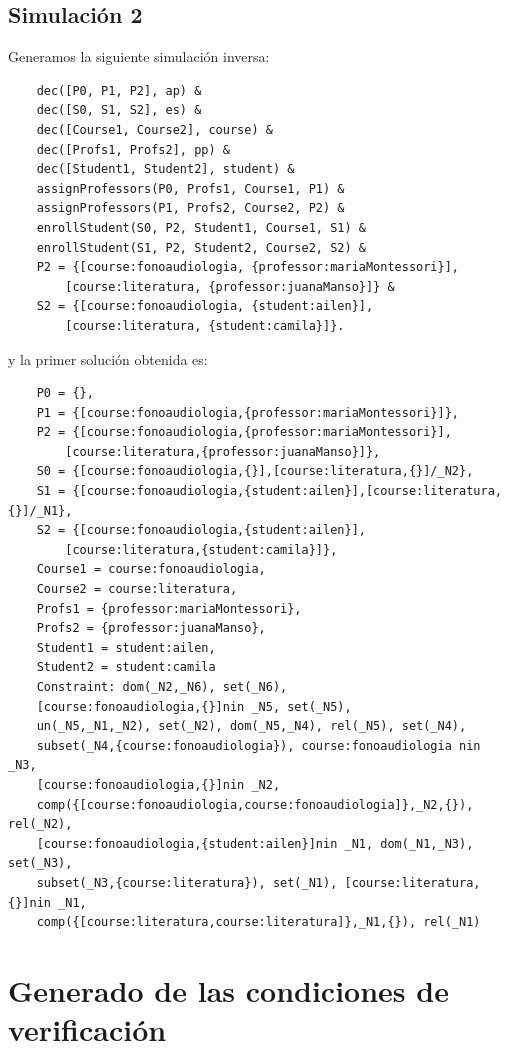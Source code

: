 \documentclass{article}
\begin{document}
\subsection*{Simulación 2}

Generamos la siguiente simulación inversa:

\begin{verbatim}
    dec([P0, P1, P2], ap) & 
    dec([S0, S1, S2], es) & 
    dec([Course1, Course2], course) & 
    dec([Profs1, Profs2], pp) & 
    dec([Student1, Student2], student) & 
    assignProfessors(P0, Profs1, Course1, P1) & 
    assignProfessors(P1, Profs2, Course2, P2) & 
    enrollStudent(S0, P2, Student1, Course1, S1) & 
    enrollStudent(S1, P2, Student2, Course2, S2) & 
    P2 = {[course:fonoaudiologia, {professor:mariaMontessori}], 
        [course:literatura, {professor:juanaManso}]} & 
    S2 = {[course:fonoaudiologia, {student:ailen}], 
        [course:literatura, {student:camila}]}.
\end{verbatim}

y la primer solución obtenida es:

\begin{verbatim}
    P0 = {},  
    P1 = {[course:fonoaudiologia,{professor:mariaMontessori}]},  
    P2 = {[course:fonoaudiologia,{professor:mariaMontessori}],
        [course:literatura,{professor:juanaManso}]},  
    S0 = {[course:fonoaudiologia,{}],[course:literatura,{}]/_N2},  
    S1 = {[course:fonoaudiologia,{student:ailen}],[course:literatura,{}]/_N1},  
    S2 = {[course:fonoaudiologia,{student:ailen}],
        [course:literatura,{student:camila}]},  
    Course1 = course:fonoaudiologia,  
    Course2 = course:literatura,  
    Profs1 = {professor:mariaMontessori},  
    Profs2 = {professor:juanaManso},  
    Student1 = student:ailen,  
    Student2 = student:camila
    Constraint: dom(_N2,_N6), set(_N6), 
    [course:fonoaudiologia,{}]nin _N5, set(_N5), 
    un(_N5,_N1,_N2), set(_N2), dom(_N5,_N4), rel(_N5), set(_N4), 
    subset(_N4,{course:fonoaudiologia}), course:fonoaudiologia nin _N3, 
    [course:fonoaudiologia,{}]nin _N2,
    comp({[course:fonoaudiologia,course:fonoaudiologia]},_N2,{}), rel(_N2), 
    [course:fonoaudiologia,{student:ailen}]nin _N1, dom(_N1,_N3), set(_N3), 
    subset(_N3,{course:literatura}), set(_N1), [course:literatura,{}]nin _N1, 
    comp({[course:literatura,course:literatura]},_N1,{}), rel(_N1)
\end{verbatim}

\section*{Generado de las condiciones de verificación}
\end{document}
